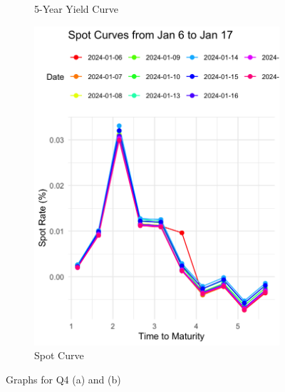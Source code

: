 \documentclass{article}
\begin{document}
\begin{enumerate}
\begin{enumerate}
\begin{figure}[htbp]
\begin{subfigure}{0.4\textwidth}
                \caption{5-Year Yield Curve}
                \label{fig:left}
            \end{subfigure}
            \hfill
            \begin{subfigure}{0.4\textwidth}
                \centering
                \includegraphics[width=\textwidth]{spot_curve.png}
                \caption{Spot Curve}
                \label{fig:right}
            \end{subfigure}
            \caption{Graphs for Q4 (a) and (b)}
            \label{fig:twoimages}
        \end{figure}


\end{enumerate}
\end{enumerate}
\end{document}
